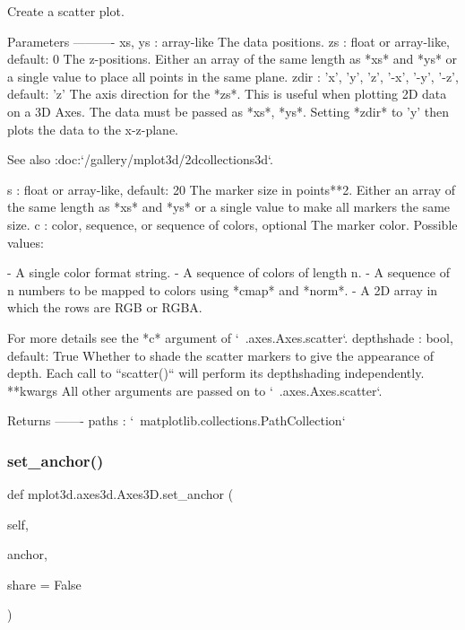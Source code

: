 \begin{DoxyVerb}
\begin{DoxyVerb}Create a scatter plot.

Parameters
----------
xs, ys : array-like
     The data positions.
zs : float or array-like, default: 0
    The z-positions. Either an array of the same length as *xs* and
    *ys* or a single value to place all points in the same plane.
zdir : {'x', 'y', 'z', '-x', '-y', '-z'}, default: 'z'
    The axis direction for the *zs*. This is useful when plotting 2D
    data on a 3D Axes. The data must be passed as *xs*, *ys*. Setting
    *zdir* to 'y' then plots the data to the x-z-plane.

    See also :doc:`/gallery/mplot3d/2dcollections3d`.

s : float or array-like, default: 20
    The marker size in points**2. Either an array of the same length
    as *xs* and *ys* or a single value to make all markers the same
    size.
c : color, sequence, or sequence of colors, optional
    The marker color. Possible values:

    - A single color format string.
    - A sequence of colors of length n.
    - A sequence of n numbers to be mapped to colors using *cmap* and
      *norm*.
    - A 2D array in which the rows are RGB or RGBA.

    For more details see the *c* argument of `~.axes.Axes.scatter`.
depthshade : bool, default: True
    Whether to shade the scatter markers to give the appearance of
    depth. Each call to ``scatter()`` will perform its depthshading
    independently.
**kwargs
    All other arguments are passed on to `~.axes.Axes.scatter`.

Returns
-------
paths : `~matplotlib.collections.PathCollection`
\end{DoxyVerb}
 \mbox{\label{classmplot3d_1_1axes3d_1_1Axes3D_a944f0cd51817cb9a9fc264c324b68212}} 
\subsubsection{\texorpdfstring{set\+\_\+anchor()}{set\_anchor()}}
{\footnotesize\ttfamily def mplot3d.\+axes3d.\+Axes3\+D.\+set\+\_\+anchor (\begin{DoxyParamCaption}\item[{}]{self,  }\item[{}]{anchor,  }\item[{}]{share = {\ttfamily False} }\end{DoxyParamCaption})}


\end{DoxyVerb}
